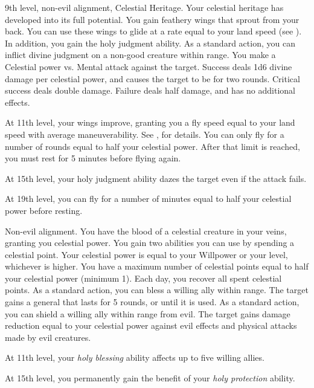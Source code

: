     \featpres 9th level, non-evil alignment, Celestial Heritage.
    \featben Your celestial heritage has developed into its full potential.
    You gain feathery wings that sprout from your back.
    You can use these wings to glide at a rate equal to your land speed (see ).
    In addition, you gain the holy judgment ability.
     As a standard action, you can inflict divine judgment on a non-good creature within \rnglong range. You make a Celestial power vs. Mental attack against the target. Success deals 1d6 divine damage per celestial power, and causes the target to be \dazed for two rounds. Critical success deals double damage. Failure deals half damage, and has no additional effects.

    At 11th level, your wings improve, granting you a fly speed equal to your land speed with average maneuverability.
    See , for details.
    You can only fly for a number of rounds equal to half your celestial power.
    After that limit is reached, you must rest for 5 minutes before flying again.

    At 15th level, your holy judgment ability dazes the target even if the attack fails.

    At 19th level, you can fly for a number of minutes equal to half your celestial power before resting.

    \featpres Non-evil alignment.
    \featben You have the blood of a celestial creature in your veins, granting you celestial power.
    You gain two abilities you can use by spending a celestial point.
    Your celestial power is equal to your Willpower or your level, whichever is higher.
    You have a maximum number of celestial points equal to half your celestial power (minimum 1).
    Each day, you recover all spent celestial points.
     As a standard action, you can bless a willing ally within \rngmed range. The target gains a general  that lasts for 5 rounds, or until it is used.
     As a standard action, you can shield a willing ally within \rngclose range from evil. The target gains damage reduction equal to your celestial power against evil effects and physical attacks made by evil creatures.

    At 11th level, your \textit{holy blessing} ability affects up to five willing allies.

    At 15th level, you permanently gain the benefit of your \textit{holy protection} ability.

